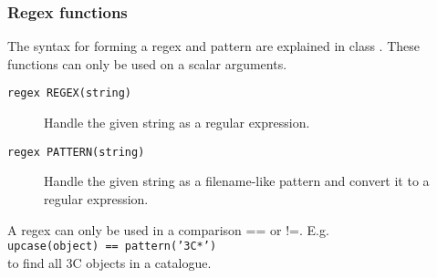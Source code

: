 \subsubsection{Regex functions}
The syntax for forming a regex and pattern are explained in class
.
These functions can only be used on a scalar arguments.

\begin{description}
  \item[ \texttt{regex REGEX(string)}]
       Handle the given string as a regular expression.
  \item[ \texttt{regex PATTERN(string)}]
       Handle the given string as a filename-like pattern and
       convert it to a regular expression.
\end{description}
A regex can only be used in a comparison == or !=. E.g.
\\\texttt{upcase(object) == pattern('3C*')}
\\to find all 3C objects in a catalogue.

